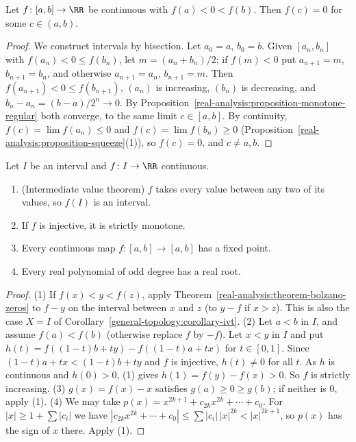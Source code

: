 \begin{theorem}\label{real-analysis:theorem-bolzano-zeros}
Let $f \colon [a, b] \to \RR$ be continuous with $f(a) < 0 < f(b)$. Then $f(c) = 0$ for some $c \in (a, b)$.
\end{theorem}

\begin{proof}
We construct intervals by bisection. Let $a_0 = a$, $b_0 = b$. Given $[a_n, b_n]$ with $f(a_n) < 0 \leq f(b_n)$, let $m = (a_n + b_n)/2$; if $f(m) < 0$ put $a_{n+1} = m$, $b_{n+1} = b_n$, and otherwise $a_{n+1} = a_n$,
$b_{n+1} = m$. Then $f(a_{n+1}) < 0 \leq f(b_{n+1})$, $(a_n)$ is increasing, $(b_n)$ is decreasing, and $b_n - a_n = (b - a)/2^n \to 0$. By Proposition~\ref{real-analysis:proposition-monotone-regular} both converge,
to the same limit $c \in [a, b]$. By continuity, $f(c) = \lim f(a_n) \leq 0$ and $f(c) = \lim f(b_n) \geq 0$ (Proposition~\ref{real-analysis:proposition-squeeze}(1)), so $f(c) = 0$, and $c \neq a, b$.
\end{proof}

\begin{corollary}\label{real-analysis:corollary-ivt-real}
Let $I$ be an interval and $f \colon I \to \RR$ continuous.
\begin{enumerate}
\item (Intermediate value theorem) $f$ takes every value between any two of its values, so $f(I)$ is an interval.
\item If $f$ is injective, it is strictly monotone.
\item Every continuous map $f \colon [a, b] \to [a, b]$ has a fixed point.
\item Every real polynomial of odd degree has a real root.
\end{enumerate}
\end{corollary}

\begin{proof}
(1) If $f(x) < y < f(z)$, apply Theorem~\ref{real-analysis:theorem-bolzano-zeros} to $f - y$ on the interval between $x$ and $z$ (to $y - f$ if $x > z$). This is also the case $X = I$ of
Corollary~\ref{general-topology:corollary-ivt}.
(2) Let $a < b$ in $I$, and assume $f(a) < f(b)$ (otherwise replace $f$ by $-f$). Let $x < y$ in $I$ and put $h(t) = f((1 - t)b + ty) - f((1 - t)a + tx)$ for $t \in [0, 1]$. Since $(1 - t)a + tx < (1 - t)b + ty$ and $f$ is injective,
$h(t) \neq 0$ for all $t$. As $h$ is continuous and $h(0) > 0$, (1) gives $h(1) = f(y) - f(x) > 0$. So $f$ is strictly increasing.
(3) $g(x) = f(x) - x$ satisfies $g(a) \geq 0 \geq g(b)$; if neither is $0$, apply (1).
(4) We may take $p(x) = x^{2k+1} + c_{2k}x^{2k} + \cdots + c_0$. For $|x| \geq 1 + \sum|c_i|$ we have $|c_{2k}x^{2k} + \cdots + c_0| \leq \sum|c_i|\,|x|^{2k} < |x|^{2k+1}$, so $p(x)$ has the sign of $x$ there. Apply (1).
\end{proof}

